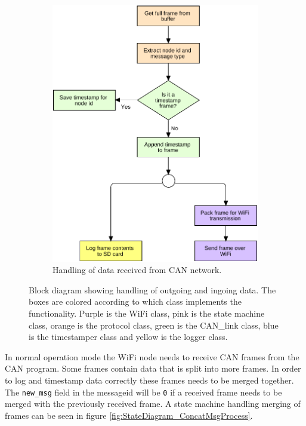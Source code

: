 \begin{figure}[!h]
\begin{subfigure}[b]{0.52\textwidth}
\includegraphics[width=1\textwidth]{graphics/FlowChart_CANFrameProcess}
\caption{Handling of data received from CAN network.}
\label{fig:FlowChart_CANFrameProcess}
\end{subfigure}
\caption{Block diagram showing handling of outgoing and ingoing data. The boxes are colored according to which class implements the functionality. Purple is the WiFi class, pink is the state machine class, orange is the protocol class, green is the CAN\_link class, blue is the timestamper class and yellow is the logger class.}
\label{fig:wifi_flow}
\end{figure}

In normal operation mode the WiFi node needs to receive CAN frames from the CAN program. 
Some frames contain data that is split into more frames.
In order to log and timestamp data correctly these frames needs to be merged together.
The \texttt{new\_msg} field in the messageid will be \texttt{0} if a received frame needs to be merged with the previously received frame.
A state machine handling merging of frames can be seen in figure \ref{fig:StateDiagram_ConcatMsgProcess}.

